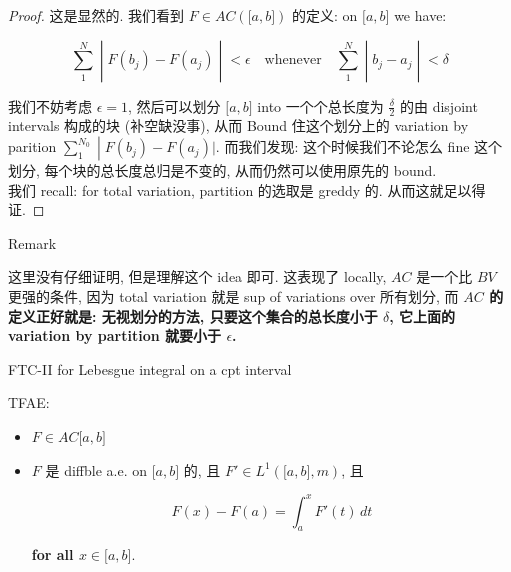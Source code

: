 \documentclass{qlnotes-export}
\begin{document}
\begin{proof}

这是显然的. 我们看到 \(F \in AC(\lbrack a,b\rbrack)\) 的定义: on \(\lbrack a,b\rbrack\) we have:

\[\left. \sum\limits_{1}^{N} \middle| F(b_{j}) - F(a_{j}) \middle| < \epsilon\quad\text{whenever}\quad\sum\limits_{1}^{N} \middle| b_{j} - a_{j} \middle| < \delta \right.\]

我们不妨考虑 \(\epsilon = 1\), 然后可以划分 \(\lbrack a,b\rbrack\) into 一个个总长度为 \(\frac{\delta}{2}\) 的由 disjoint intervals 构成的块 (补空缺没事), 从而 Bound 住这个划分上的 variation by parition \(\left. \sum_{1}^{N_{0}} \middle| F(b_{j}) - F(a_{j})| \right.\). 而我们发现: 这个时候我们不论怎么 fine 这个划分, 每个块的总长度总归是不变的, 从而仍然可以使用原先的 bound.\\
我们 recall: for total variation, partition 的选取是 greddy 的. 从而这就足以得证.

\end{proof}

\begin{qlremark}{Remark}

这里没有仔细证明, 但是理解这个 idea 即可. 这表现了 locally, \(AC\) 是一个比 \(BV\) 更强的条件, 因为 total variation 就是 sup of variations over 所有划分, 而 \textbf{\(AC\) 的定义正好就是: 无视划分的方法, 只要这个集合的总长度小于 \(\delta\), 它上面的 variation by partition 就要小于 \(\epsilon\).}

\end{qlremark}

\begin{theorem}{FTC-II for Lebesgue integral on a cpt interval}\label{thm-12-differentiation-on-real-spaces-ftc-ii-for-lebesgue-integral-on-a-cpt-interval}

TFAE:

\begin{itemize}
\item
  \(F \in AC\lbrack a,b\rbrack\)
\item
  \(F\) 是 diffble a.e. on \(\lbrack a,b\rbrack\) 的, 且 \(F' \in L^{1}(\lbrack a,b\rbrack,m)\), 且

  \[F(x) - F(a) = \int_{a}^{x}F'(t)\, dt\]

  \textbf{for all \(x \in \lbrack a,b\rbrack\)}.
\end{itemize}

\end{theorem}
\end{document}
